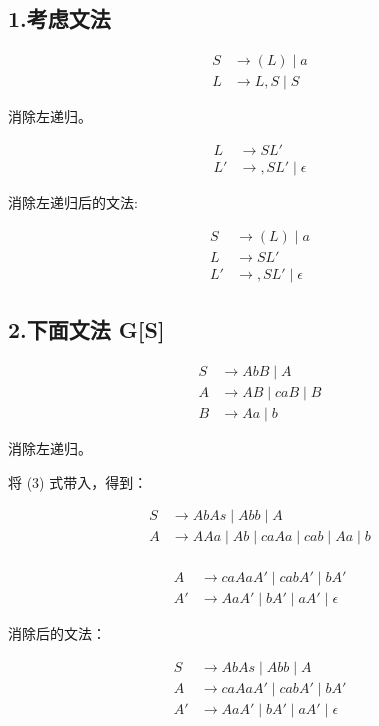 \documentclass[a4paper, body={18cm,22cm}]{article}
\begin{document}
\newpage

\subsection*{1.考虑文法}

\begin{align*}
S &\rightarrow (L) \mid a \\
L &\rightarrow L, S \mid S
\end{align*}

消除左递归。

\begin{align*}
L &\to SL'\\
L' &\to ,SL' \mid \epsilon
\end{align*}

消除左递归后的文法:

\begin{align*}
S &\rightarrow (L) \mid a \\
L &\rightarrow SL' \\
L' &\rightarrow ,SL' \mid \epsilon
\end{align*}

\subsection*{2.下面文法 G[S]}

\begin{align*}
S &\rightarrow AbB \mid A \\
A &\rightarrow AB \mid caB \mid B \\
B &\rightarrow Aa \mid b
\end{align*}

消除左递归。

将 (3) 式带入，得到：


\begin{align*}
S &\to AbAs \mid Abb \mid A \\
A &\to AAa \mid Ab \mid caAa \mid cab \mid Aa \mid b \\
\end{align*}

\begin{align*}
A &\to caAaA' \mid cabA' \mid bA' \\
A' &\to AaA' \mid bA' \mid aA' \mid \epsilon 
\end{align*}

消除后的文法：

\begin{align*}
S &\to AbAs \mid Abb \mid A \\
A &\to caAaA' \mid cabA' \mid bA' \\
A' &\to AaA' \mid bA' \mid aA' \mid \epsilon
\end{align*}
\end{document}
